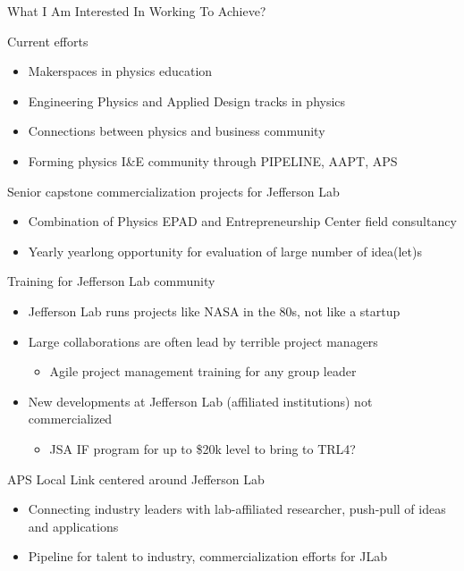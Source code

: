 \documentclass[xcolor={dvipsnames},professionalfonts]{beamer}
\begin{document}
\begin{frame}[allowframebreaks]{What I Am Interested In Working To Achieve?}
 \begin{block}{Current efforts}
  \begin{itemize}
   \item Makerspaces in physics education
   \item Engineering Physics and Applied Design tracks in physics
   \item Connections between physics and business community
   \item Forming physics I\&E community through PIPELINE, AAPT, APS
  \end{itemize}
 \end{block}
 \begin{block}{Senior capstone commercialization projects for Jefferson Lab}
  \begin{itemize}
   \item Combination of Physics EPAD and Entrepreneurship Center field consultancy
   \item Yearly yearlong opportunity for evaluation of large number of idea(let)s
  \end{itemize}
 \end{block}
 \begin{block}{Training for Jefferson Lab community}
  \begin{itemize}
   \item Jefferson Lab runs projects like NASA in the 80s, not like a startup
   \item Large collaborations are often lead by terrible project managers
   \begin{itemize}
    \item Agile project management training for any group leader
   \end{itemize}
   \item New developments at Jefferson Lab (affiliated institutions) not commercialized
   \begin{itemize}
    \item JSA IF program for up to \$20k level to bring to TRL4?
   \end{itemize}
  \end{itemize}
 \end{block}
 \begin{block}{APS Local Link centered around Jefferson Lab}
  \begin{itemize}
   \item Connecting industry leaders with lab-affiliated researcher, push-pull of ideas and applications
   \item Pipeline for talent to industry, commercialization efforts for JLab
  \end{itemize}
 \end{block}
\end{frame}


\end{document}
